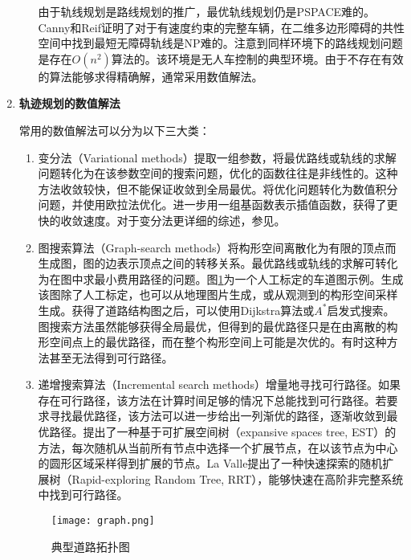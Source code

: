 \begin{enumerate}[wide=\parindent]
\begin{enumerate}[label=(\arabic*),wide=\parindent]
由于轨线规划是路线规划的推广，最优轨线规划仍是PSPACE难的。Canny和Reif\cite{Canny1987New}证明了对于有速度约束的完整车辆，在二维多边形障碍的共性空间中找到最短无障碍轨线是NP难的。注意到同样环境下的路线规划问题是存在$O(n^2)$算法的。该环境是无人车控制的典型环境。由于不存在有效的算法能够求得精确解，通常采用数值解法。
\end{enumerate}

\item \textbf{轨迹规划的数值解法 }

常用的数值解法可以分为以下三大类：

\begin{enumerate}[label=(\arabic*),wide=\parindent]
\item 变分法（Variational methods）提取一组参数，将最优路线或轨线的求解问题转化为在该参数空间的搜索问题，优化的函数往往是非线性的。这种方法收敛较快，但不能保证收敛到全局最优。将优化问题转化为数值积分问题，并使用欧拉法优化。进一步用一组基函数表示插值函数，获得了更快的收敛速度。对于变分法更详细的综述，参见。

\item 图搜索算法（Graph-search methods）将构形空间离散化为有限的顶点而生成图，图的边表示顶点之间的转移关系。最优路线或轨线的求解可转化为在图中求最小费用路径的问题。图\ref{fig:graph}为一个人工标定的车道图示例。生成该图除了人工标定，也可以从地理图片生成\cite{Backer2007Finding,Wang1996Approximation}，或从观测到的构形空间采样生成\cite{Lavalle1999Rapidly,Glassman2010A}。获得了道路结构图之后，可以使用Dijkstra算法\cite{Dijkstra1959A}或$A^*$启发式搜索\cite{Hart2010A}。图搜索方法虽然能够获得全局最优，但得到的最优路径只是在由离散的构形空间点上的最优路径，而在整个构形空间上可能是次优的。有时这种方法甚至无法得到可行路径。

\item 递增搜索算法（Incremental search methods）增量地寻找可行路径。如果存在可行路径，该方法在计算时间足够的情况下总能找到可行路径。若要求寻找最优路径，该方法可以进一步给出一列渐优的路径，逐渐收敛到最优路径。提出了一种基于可扩展空间树（expansive spaces tree, EST）的方法，每次随机从当前所有节点中选择一个扩展节点，在以该节点为中心的圆形区域采样得到扩展的节点。La Valle\cite{Lavalle1999Rapidly}提出了一种快速探索的随机扩展树（Rapid-exploring Random Tree, RRT），能够快速在高阶非完整系统中找到可行路径。
\end{enumerate}

\begin{figure}[htbp]
\centering
\texttt{[image: graph.png]}
\caption{典型道路拓扑图}
\label{fig:graph}
\end{figure}


\end{enumerate}
